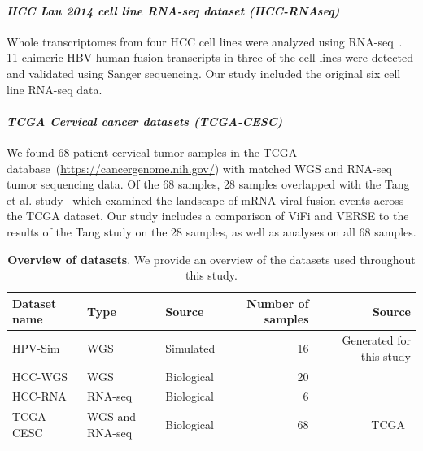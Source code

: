 \documentclass[11pt]{article}
\begin{document}
\paragraph{\emph{HCC Lau 2014 cell line RNA-seq dataset (HCC-RNAseq)}}
Whole transcriptomes from four HCC cell lines were analyzed using RNA-seq~\cite{Lau2014}.  11 chimeric HBV-human fusion transcripts in three of the cell lines were detected and validated using Sanger sequencing.  Our study included the original six cell line RNA-seq data.  

\paragraph{\emph{TCGA Cervical cancer datasets (TCGA-CESC)}}
We found 68 patient cervical tumor samples in the TCGA database~(\url{https://cancergenome.nih.gov/}) with matched WGS and RNA-seq tumor sequencing data.  Of the 68 samples, 28 samples overlapped with the Tang et al. study~\cite{Tang2013} which examined the landscape of mRNA viral fusion events across the TCGA dataset.  Our study includes a comparison of ViFi and VERSE to the results of the Tang study on the 28 samples, as well as analyses on all 68 samples.


\begin{table}[htb]
\centering
\caption{\textbf{Overview of datasets}.  We provide an overview of the datasets used throughout this study.  }
\label{table:data}
\begin{tabular}{|l|l|l|r|r|}
\hline
Dataset name & Type & Source & Number of samples & Source \\ \hline
HPV-Sim & WGS &Simulated& 16 & Generated for this study \\ \hline
HCC-WGS & WGS & Biological&20 & ~\cite{Sung2012} \\ \hline
HCC-RNA & RNA-seq & Biological&6 & ~\cite{Lau2014} \\ \hline
TCGA-CESC & WGS and RNA-seq &Biological& 68 & TCGA~\cite{TODO} \\ \hline 
\end{tabular}
\end{table}

\end{document}
